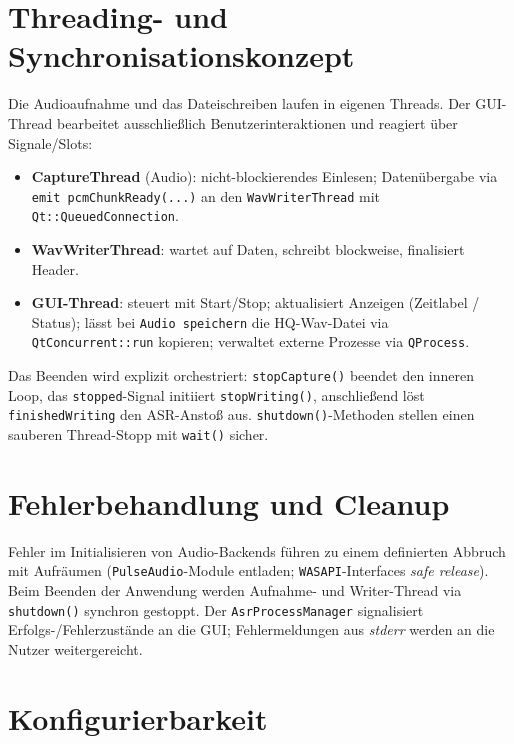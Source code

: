 \section{Threading- und Synchronisationskonzept}
\label{sec:threading}

Die Audioaufnahme und das Dateischreiben laufen in eigenen Threads. Der GUI-Thread bearbeitet ausschließlich Benutzerinteraktionen und reagiert über Signale/Slots:

\begin{itemize}
    \item \textbf{CaptureThread} (Audio): nicht-blockierendes Einlesen; Datenübergabe via \texttt{emit pcmChunkReady(...)} an den \texttt{WavWriterThread} mit \texttt{Qt::QueuedConnection}.
    \item \textbf{WavWriterThread}: wartet auf Daten, schreibt blockweise, finalisiert Header.
    \item \textbf{GUI-Thread}: steuert mit Start/Stop; aktualisiert Anzeigen (Zeitlabel / Status); lässt bei \texttt{Audio speichern} die HQ-Wav-Datei via \texttt{QtConcurrent::run} kopieren; verwaltet externe Prozesse via \texttt{QProcess}.
\end{itemize}

Das Beenden wird explizit orchestriert: \texttt{stopCapture()} beendet den inneren Loop, das \texttt{stopped}-Signal initiiert \texttt{stopWriting()}, anschließend löst \texttt{finishedWriting} den \ac{ASR}-Anstoß aus. \texttt{shutdown()}-Methoden stellen einen sauberen Thread-Stopp mit \texttt{wait()} sicher.


\section{Fehlerbehandlung und Cleanup}
\label{sec:cleanup}

Fehler im Initialisieren von Audio-Backends führen zu einem definierten Abbruch mit Aufräumen (\texttt{PulseAudio}-Module entladen; \texttt{WASAPI}-Interfaces \emph{safe release}). Beim Beenden der Anwendung werden Aufnahme- und Writer-Thread via \texttt{shutdown()} synchron gestoppt. Der \texttt{AsrProcessManager} signalisiert Erfolgs-/Fehlerzustände an die \ac{GUI}; Fehlermeldungen aus \emph{stderr} werden an die Nutzer weitergereicht.

\section{Konfigurierbarkeit}
\label{sec:config}

